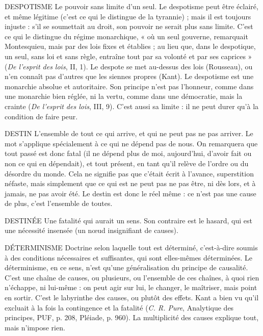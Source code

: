 DESPOTISME Le pouvoir sans limite d’un seul.
Le despotisme peut être éclairé, et même légitime (c’est ce
qui le distingue de la tyrannie) ; mais il est toujours injuste : s’il se soumettait
au droit, son pouvoir ne serait plus sans limite. C’est ce qui le distingue du
régime monarchique, « où un seul gouverne, remarquait Montesquieu, mais
par des lois fixes et établies ; au lieu que, dans le despotique, un seul, sans loi et
sans règle, entraîne tout par sa volonté et par ses caprices » ({\it De l'esprit des lois},
II, 1). Le despote se met au-dessus des lois (Rousseau), ou n’en connaît pas
d’autres que les siennes propres (Kant). Le despotisme est une monarchie
absolue et autoritaire. Son principe n’est pas l’honneur, comme dans une
monarchie bien réglée, ni la vertu, comme dans une démocratie, mais la crainte
({\it De l'esprit des lois}, III, 9). C’est aussi sa limite : il ne peut durer qu’à la
condition de faire peur.

DESTIN L'ensemble de tout ce qui arrive, et qui ne peut pas ne pas arriver.
Le mot s'applique spécialement à ce qui ne dépend pas de nous.
On remarquera que tout passé est donc fatal (il ne dépend plus de moi,
aujourd’hui, d’avoir fait ou non ce qui en dépendait), et tout présent, en tant
qu’il relève de l’ordre ou du désordre du monde. Cela ne signifie pas que c’était
écrit à l’avance, superstition néfaste, mais simplement que ce qui est ne peut
pas ne pas être, ni dès lors, et à jamais, ne pas avoir été. Le destin est donc le
réel même : ce n’est pas une cause de plus, c’est l’ensemble de toutes.

DESTINÉE Une fatalité qui aurait un sens. Son contraire est le hasard, qui
est une nécessité insensée (un nœud insignifiant de causes).

DÉTERMINISME Doctrine selon laquelle tout est déterminé, c’est-à-dire
soumis à des conditions nécessaires et suffisantes, qui
sont elles-mêmes déterminées. Le déterminisme, en ce sens, n’est qu’une
généralisation du principe de causalité. C’est une chaîne de causes, ou plusieurs, ou
l’ensemble de ces chaînes, à quoi rien n’échappe, ni lui-même : on peut agir sur
lui, le changer, le maîtriser, mais point en sortir. C’est le labyrinthe des causes,
ou plutôt des effets. Kant a bien vu qu’il excluait à la fois la contingence et la
fatalité ({\it C. R. Pure}, Analytique des principes, PUF, p. 208, Pléiade, p. 960). La
multiplicité des causes explique tout, mais n’impose rien.

